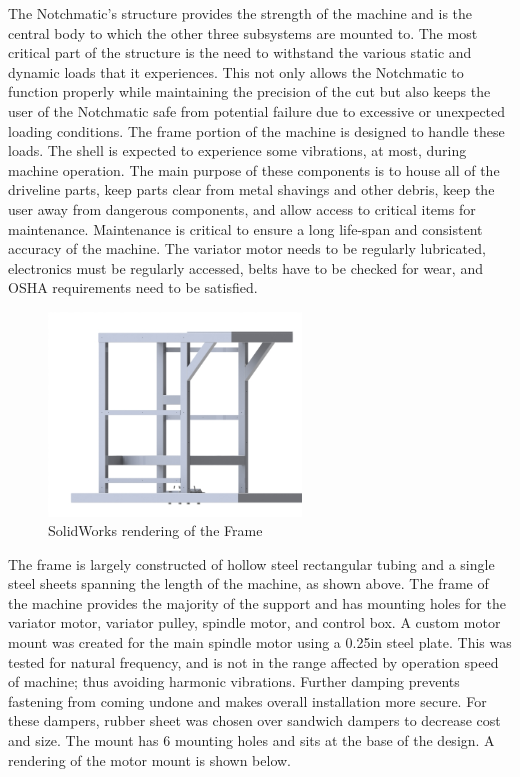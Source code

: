 The Notchmatic's structure provides the strength of the machine and is the central body to which the other three  subsystems are mounted to. The most critical part of the structure is the need to withstand the various static and dynamic loads that it experiences. This not only allows the Notchmatic to function properly while maintaining the precision of the cut but also keeps the user of the Notchmatic safe from potential failure due to excessive or unexpected loading conditions. The frame portion of the machine is designed to handle these loads. The shell is expected to experience some vibrations, at most, during machine operation. The main purpose of these components is to house all of the driveline parts, keep parts clear from metal shavings and other debris, keep the user away from dangerous components, and allow access to critical items for maintenance.  Maintenance is critical to ensure a long life-span and consistent accuracy of the machine. The variator motor needs to be regularly lubricated, electronics must be regularly accessed, belts have to be checked for wear, and OSHA requirements need to be satisfied. 

\begin{figure}[H]
    \centering
    \includegraphics[width=0.6\textwidth]{./images/Chapter2-MachineDescription/Frame}
    \caption{SolidWorks rendering of the Frame}
    \label{fig:Frame}
\end{figure}

The frame is largely constructed of hollow steel rectangular tubing and a single steel sheets spanning the length of the machine, as shown above.  The frame of the machine provides the majority of the support and has mounting holes for the variator motor, variator pulley, spindle motor, and control box. A custom  motor mount was created for the main spindle motor using a 0.25in steel plate. This was tested for natural frequency, and is not in the range affected by operation speed of machine; thus avoiding harmonic vibrations. Further damping prevents fastening from coming undone and makes overall installation more secure. For these dampers, rubber sheet was chosen over sandwich dampers to decrease cost and size. The mount has 6 mounting holes and sits at the base of the design. A rendering of the motor mount is shown below.

